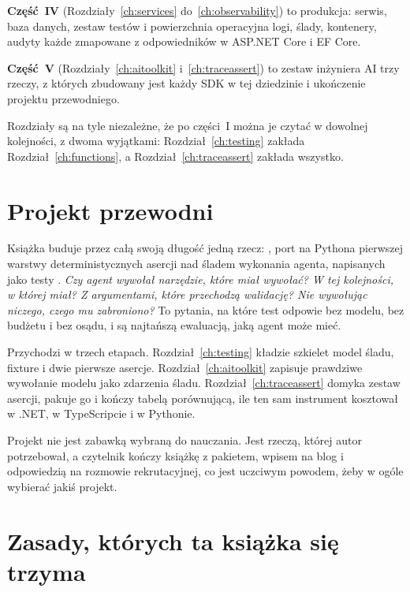 \textbf{Część~IV \dash{} \lblPartIV} (Rozdziały~\ref{ch:services}
do~\ref{ch:observability}) to produkcja: serwis, baza danych, zestaw testów i
powierzchnia operacyjna \dash{} logi, ślady, kontenery, audyty \dash{} każde
zmapowane z odpowiedników w ASP.NET Core i EF Core.

\textbf{Część~V \dash{} \lblPartV} (Rozdziały~\ref{ch:aitoolkit}
i~\ref{ch:traceassert}) to zestaw inżyniera AI \dash{} trzy rzeczy, z których
zbudowany jest każdy SDK w tej dziedzinie \dash{} i ukończenie projektu
przewodniego.

Rozdziały są na tyle niezależne, że po części~I można je czytać w dowolnej
kolejności, z dwoma wyjątkami: Rozdział~\ref{ch:testing} zakłada
Rozdział~\ref{ch:functions}, a Rozdział~\ref{ch:traceassert} zakłada
wszystko.

\section*{Projekt przewodni}

Książka buduje przez całą swoją długość jedną rzecz:
\textbf{}, port na Pythona pierwszej warstwy
 \dash{} deterministycznych asercji nad śladem
wykonania agenta, napisanych jako testy . \emph{Czy agent wywołał
narzędzie, które miał wywołać? W tej kolejności, w której miał? Z argumentami,
które przechodzą walidację? Nie wywołując niczego, czego mu zabroniono?} To
pytania, na które test odpowie bez modelu, bez budżetu i bez osądu, i są
najtańszą ewaluacją, jaką agent może mieć.

Przychodzi w trzech etapach. Rozdział~\ref{ch:testing} kładzie szkielet
\dash{} model śladu, fixture i dwie pierwsze asercje.
Rozdział~\ref{ch:aitoolkit} zapisuje prawdziwe wywołanie modelu jako
zdarzenia śladu. Rozdział~\ref{ch:traceassert} domyka zestaw asercji, pakuje
go i kończy tabelą porównującą, ile ten sam instrument kosztował w .NET, w
TypeScripcie i w Pythonie.

Projekt nie jest zabawką wybraną do nauczania. Jest rzeczą, której autor
potrzebował, a czytelnik kończy książkę z pakietem, wpisem na blog i
odpowiedzią na rozmowie rekrutacyjnej, co jest uczciwym powodem, żeby w ogóle
wybierać jakiś projekt.

\section*{Zasady, których ta książka się trzyma}

